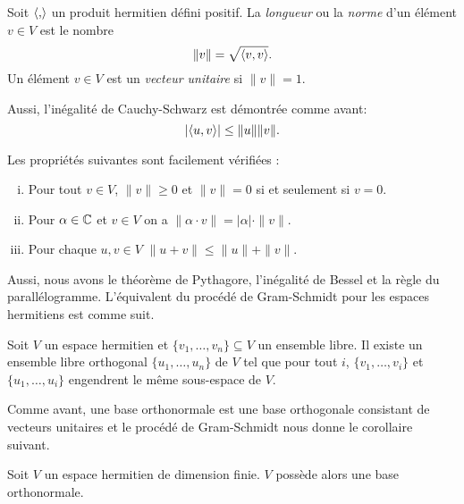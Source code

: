 \begin{definition}
  \label{def:h5}
  Soit $\langle {,} \rangle$ un produit hermitien défini positif. La \emph{longueur} ou la \emph{norme} d'un élément $v \in V$ est le nombre 
  \begin{displaymath}
    \| v \| = \sqrt{\langle {v,v} \rangle}.
  \end{displaymath}
  Un élément $v \in V$ est un \emph{vecteur unitaire} si $\|v\| = 1$. 
\end{definition}

Aussi, l'inégalité de Cauchy-Schwarz est démontrée comme avant: 
\begin{equation}
  \label{eq:6}
  | \langle {u,v} \rangle| \leq \|u\| \|v\|. 
\end{equation}


Les propriétés suivantes sont facilement vérifiées :
\begin{enumerate}[i)]
\item Pour tout $v \in V$, $\|v\|\geq 0$ et $\|v\| = 0$ si et seulement si $v = 0$. \label{item:8}
\item Pour $\alpha \in \mathbb{C}$ et $v \in V$ on a $\| \alpha \cdot v \| = |\alpha| \cdot \|v\|$. \label{item:9}
\item Pour chaque $u,v \in V$ $\|u+v\| \leq \|u\| + \|v\|$. \label{tr:2}
\end{enumerate}

Aussi, nous avons le théorème de Pythagore, l'inégalité de Bessel et la règle du parallélogramme.  
L'équivalent du procédé de Gram-Schmidt pour les espaces hermitiens est comme suit. 


\begin{theorem}
\label{thr:12}
  Soit $V$ un espace hermitien et  $\{v_1,\dots,v_n\} \subseteq V$
  un ensemble libre.  
  Il existe un ensemble libre orthogonal $\{u_1,\dots,u_n\}$
  de $V$
  tel que pour tout $i$,
  $\{v_1,\dots,v_i\}$
  et $\{u_1,\dots,u_i\}$ engendrent le même sous-espace de $V$.
\end{theorem}

Comme avant, une base orthonormale est une base orthogonale consistant
de vecteurs unitaires et le procédé de Gram-Schmidt nous donne le
corollaire suivant.

\begin{corollary}
  \label{co:6}
  Soit $V$
  un espace hermitien de dimension finie.  $V$
  possède alors une base orthonormale.
\end{corollary}



